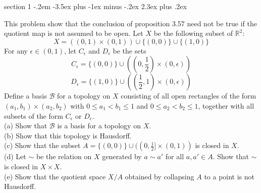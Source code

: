 \documentclass[12pt]{article}
\makeatletter
\newenvironment{p}{\@startsection
       {section}
       {1}
       {-.2em}
       {-3.5ex plus -1ex minus -.2ex}
       {2.3ex plus .2ex}
       {\pagebreak[3]%
       \large\bf\noindent{P }
       }
       }
\makeatother
\begin{document}
\begin{p}{3.17}
    This problem show that the conclusion of proposition 3.57 need not be true if the quotient map is not assumed to be 
    open. Let $X$ be the following subset of $\mathbb{R}^2$:
    $$X = ((0,1)\times (0,1))\cup \{(0,0)\} \cup \{(1,0)\}$$
    For any $\epsilon \in (0,1)$, let $C_\epsilon$ and $D_\epsilon$ be the sets
    $$C_\epsilon = \{(0,0)\} \cup ((0,\frac{1}{2})\times (0,\epsilon))$$
    $$D_\epsilon = \{(1,0)\} \cup ((\frac{1}{2},1)\times (0,\epsilon))$$
    Define a basis $\mathcal{B}$ for a topology on $X$ consisting of all open rectangles of the form
    $(a_1,b_1)\times (a_2,b_2)$ with $0\le a_1 < b_1 \le 1$ and $0\le a_2 < b_2 \le 1$, together 
    with all subsets of the form $C_\epsilon$ or $D_\epsilon$.\\
    (a) Show that $\mathscr{B}$ is a basis for a topology on $X$.\\
    (b) Show that this topology is Hausdorff.\\
    (c) Show that the subset $A=\{(0,0)\} \cup ((0,\frac{1}{2}]\times (0,1))$ is closed in $X$.\\
    (d) Let $\sim$ be the relation on $X$ generated by $a \sim a'$ for all $a,a' \in A$. Show that $\sim$ is closed 
    in $X\times X$.\\
    (e) Show that the quotient space $X/A$ obtained by collapsing $A$ to a point is not Hausdorff.
\end{p}
\end{document}
